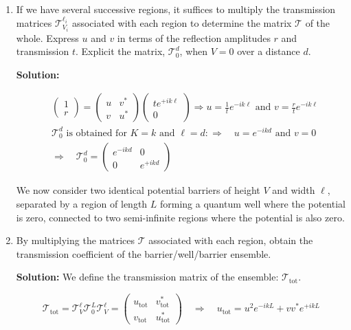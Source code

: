 \documentclass{article}
\begin{document}
\begin{enumerate}
    \item If we have several successive regions, it suffices to multiply the transmission matrices $\mathcal{T}_{V_{i}}^{\ell_{i}}$ associated with each region to determine the matrix $\mathcal{T}$ of the whole.
    Express $u$ and $v$ in terms of the reflection amplitudes $r$ and transmission $t$.
    Explicit the matrix, $\mathcal{T}_{0}^{d}$, when $V=0$ over a distance $d$.

    {\color{red}\textbf{Solution:}

    $$
    \begin{aligned}
    & \left(\begin{array}{c}
    1 \\
    r
    \end{array}\right) = \left(\begin{array}{cc}
    u & v^{*} \\
    v & u^{*}
    \end{array}\right) \left(\begin{array}{c}
    t e^{+i k \ell} \\
    0
    \end{array}\right) \Rightarrow u = \frac{1}{t} e^{-i k \ell} \text{ and } v = \frac{r}{t} e^{-i k \ell} \\
    & \mathcal{T}_{0}^{d} \text{ is obtained for } K = k \text{ and } \ell = d: \Rightarrow \quad u = e^{-i k d} \text{ and } v = 0 \\
    & \Rightarrow \quad \mathcal{T}_{0}^{d} = \left(\begin{array}{cc}
    e^{-i k d} & 0 \\
    0 & e^{+i k d}
    \end{array}\right)
    \end{aligned}
    $$

    We now consider two identical potential barriers of height $V$ and width $\ell$, separated by a region of length $L$ forming a quantum well where the potential is zero, connected to two semi-infinite regions where the potential is also zero.}

    \item By multiplying the matrices $\mathcal{T}$ associated with each region, obtain the transmission coefficient of the barrier/well/barrier ensemble.

    {\color{red}\textbf{Solution:} We define the transmission matrix of the ensemble: $\mathcal{T}_{\text{tot}}$.

    $$
    \mathcal{T}_{\text{tot}} = \mathcal{T}_{V}^{\ell} \mathcal{T}_{0}^{L} \mathcal{T}_{V}^{\ell} = \left(\begin{array}{cc}
    u_{\text{tot}} & v_{\text{tot}}^{*} \\
    v_{\text{tot}} & u_{\text{tot}}^{*}
    \end{array}\right) \quad \Rightarrow \quad u_{\text{tot}} = u^{2} e^{-i k L} + v v^{*} e^{+i k L}
    $$

}
\end{enumerate}
\end{document}
